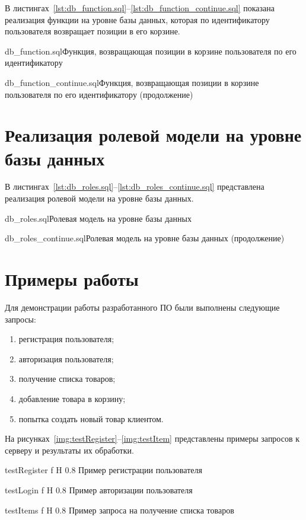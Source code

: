 \documentclass{bmstu}
\begin{document}
В листингах~\ref{lst:db_function.sql}--\ref{lst:db_function_continue.sql} показана реализация функции на уровне базы данных, которая по идентификатору пользователя возвращает позиции в его корзине. 

{db_function.sql}{Функция, возвращающая позиции в корзине пользователя по его идентификатору}

{db_function_continue.sql}{Функция, возвращающая позиции в корзине пользователя по его идентификатору (продолжение)}

\section{Реализация ролевой модели на уровне базы данных}

В листингах~\ref{lst:db_roles.sql}--\ref{lst:db_roles_continue.sql} представлена реализация ролевой модели на уровне базы данных.

{db_roles.sql}{Ролевая модель на уровне базы данных}

{db_roles_continue.sql}{Ролевая модель на уровне базы данных (продолжение)}


\section{Примеры работы}

Для демонстрации работы разработанного ПО были выполнены следующие запросы:

\begin{enumerate}
	\item регистрация пользователя;
	\item авторизация пользователя;
	\item получение списка товаров;
	\item добавление товара в корзину;
	\item попытка создать новый товар клиентом.
\end{enumerate}

На рисунках~\ref{img:testRegister}--\ref{img:testItem} представлены примеры запросов к серверу и результаты их обработки.

{testRegister}
{f}
{H}
{0.8\textwidth}
{Пример регистрации пользователя}

{testLogin}
{f}
{H}
{0.8\textwidth}
{Пример авторизации пользователя}

{testItems}
{f}
{H}
{0.8\textwidth}
{Пример запроса на получение списка товаров}
\end{document}

